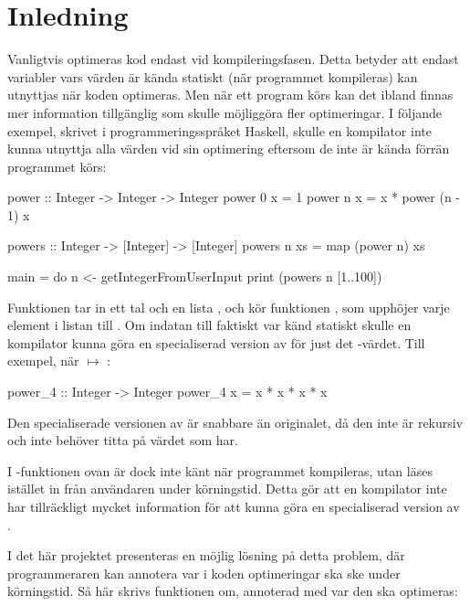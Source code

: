 \documentclass[Rapport]{subfiles}
\begin{document}
\section{Inledning}

Vanligtvis optimeras kod endast vid kompileringsfasen. Detta betyder att endast variabler
vars värden är kända statiskt (när programmet kompileras) kan utnyttjas när koden optimeras. Men när ett program 
körs kan det ibland finnas mer information tillgänglig som skulle möjliggöra 
fler optimeringar. I följande exempel, skrivet
i programmeringsspråket Haskell, skulle en kompilator inte kunna
utnyttja alla värden vid sin optimering eftersom de inte är kända förrän programmet körs:

\begin{codeEx}
power :: Integer -> Integer -> Integer
power 0 x = 1
power n x = x * power (n - 1) x

powers :: Integer -> [Integer] -> [Integer]
powers n xs = map (power n) xs

main = do
    n <- getIntegerFromUserInput
    print (powers n [1..100])

\end{codeEx}

Funktionen  tar in ett tal 
och en lista , och kör funktionen , 
som upphöjer varje element i listan till . 
Om indatan  till 
 faktiskt var känd statiskt skulle en kompilator kunna 
göra en specialiserad version av  för just det -värdet. Till exempel, när  $\mapsto$ :

\begin{codeEx}
power_4 :: Integer -> Integer
power_4 x = x * x * x * x
\end{codeEx}

Den specialiserade versionen av  är snabbare än originalet, då den inte är 
rekursiv och inte behöver titta på värdet som  har.

I -funktionen ovan är dock  inte känt när programmet kompileras, utan läses 
istället in från användaren under körningstid. Detta gör att en kompilator inte 
har tillräckligt mycket information för att kunna göra en specialiserad version av .

I det här projektet presenteras en möjlig lösning på detta problem,
där programmeraren kan annotera var i koden optimeringar ska ske under körningstid.
Så här skrivs funktionen  om,
annoterad med var den ska optimeras:
\end{document}
